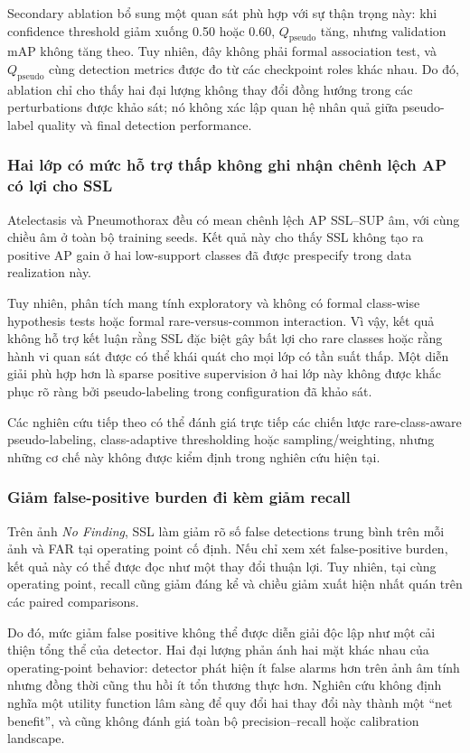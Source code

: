 \documentclass[pdflatex,sn-mathphys-num]{sn-jnl}%
\theoremstyle{thmstyleone}%
\theoremstyle{thmstyletwo}%
\theoremstyle{thmstylethree}%
\begin{document}
Secondary ablation bổ sung một quan sát phù hợp với sự thận trọng này: khi confidence threshold giảm xuống 0.50 hoặc 0.60, $Q_{\mathrm{pseudo}}$ tăng, nhưng validation mAP không tăng theo. Tuy nhiên, đây không phải formal association test, và $Q_{\mathrm{pseudo}}$ cùng detection metrics được đo từ các checkpoint roles khác nhau. Do đó, ablation chỉ cho thấy hai đại lượng không thay đổi đồng hướng trong các perturbations được khảo sát; nó không xác lập quan hệ nhân quả giữa pseudo-label quality và final detection performance.

\subsubsection{Hai lớp có mức hỗ trợ thấp không ghi nhận chênh lệch AP có lợi cho SSL}

Atelectasis và Pneumothorax đều có mean chênh lệch AP SSL--SUP âm, với cùng chiều âm ở toàn bộ training seeds. Kết quả này cho thấy SSL không tạo ra positive AP gain ở hai low-support classes đã được prespecify trong data realization này.

Tuy nhiên, phân tích mang tính exploratory và không có formal class-wise hypothesis tests hoặc formal rare-versus-common interaction. Vì vậy, kết quả không hỗ trợ kết luận rằng SSL đặc biệt gây bất lợi cho rare classes hoặc rằng hành vi quan sát được có thể khái quát cho mọi lớp có tần suất thấp. Một diễn giải phù hợp hơn là sparse positive supervision ở hai lớp này không được khắc phục rõ ràng bởi pseudo-labeling trong configuration đã khảo sát.

Các nghiên cứu tiếp theo có thể đánh giá trực tiếp các chiến lược rare-class-aware pseudo-labeling, class-adaptive thresholding hoặc sampling/weighting, nhưng những cơ chế này không được kiểm định trong nghiên cứu hiện tại.

\subsubsection{Giảm false-positive burden đi kèm giảm recall}

Trên ảnh \textit{No Finding}, SSL làm giảm rõ số false detections trung bình trên mỗi ảnh và FAR tại operating point cố định. Nếu chỉ xem xét false-positive burden, kết quả này có thể được đọc như một thay đổi thuận lợi. Tuy nhiên, tại cùng operating point, recall cũng giảm đáng kể và chiều giảm xuất hiện nhất quán trên các paired comparisons.

Do đó, mức giảm false positive không thể được diễn giải độc lập như một cải thiện tổng thể của detector. Hai đại lượng phản ánh hai mặt khác nhau của operating-point behavior: detector phát hiện ít false alarms hơn trên ảnh âm tính nhưng đồng thời cũng thu hồi ít tổn thương thực hơn. Nghiên cứu không định nghĩa một utility function lâm sàng để quy đổi hai thay đổi này thành một ``net benefit'', và cũng không đánh giá toàn bộ precision--recall hoặc calibration landscape.
\end{document}
